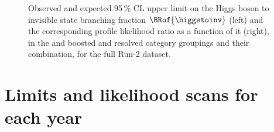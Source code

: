 \begin{figure}[htbp]
    \caption[Observed and expected 95\,\% CL upper limit on the Higgs boson to invisible state branching fraction $\BRof{\higgstoinv}$ and the corresponding profile likelihood ratio as a function of it, in the \ttH and \VH boosted and resolved category groupings and their combination, for the full Run-2 dataset]{Observed and expected 95\,\% CL upper limit on the Higgs boson to invisible state branching fraction $\BRof{\higgstoinv}$ (left) and the corresponding profile likelihood ratio as a function of it (right), in the \ttH and \VH boosted and resolved category groupings and their combination, for the full Run-2 dataset.}
    \label{fig:htoinv_limit_likelihood_boosted_resolved_cats_Run2}
\end{figure}

\clearpage




\section{Limits and likelihood scans for each year}
\label{sec:limits_likelihoods_year_supplementary}

